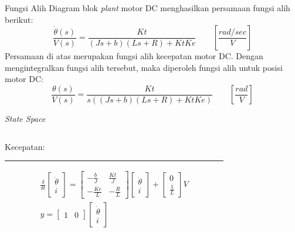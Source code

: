 \documentclass[10pt,xcolor={dvipsnames}]{beamer}
\begin{document}
\begin{frame}{Fungsi Alih}
	Diagram blok \textit{plant} motor DC menghasilkan persamaan fungsi alih berikut:
	\begin{equation}
		\frac{\dot{\theta}(s)}{V(s)}=\frac{Kt}{(Js+b)(Ls+R)+KtKe} \qquad \left[\frac{rad/sec}{V}\right] 
	\end{equation} 
	Persamaan di atas merupakan fungsi alih kecepatan motor DC. Dengan mengintegralkan fungsi alih tersebut, maka diperoleh fungsi alih untuk posisi motor DC:
	\begin{equation}
		\frac{\theta(s)}{V(s)}=\frac{Kt}{s((Js+b)(Ls+R)+KtKe)} \qquad \left[\frac{rad}{V}\right]
		\label{position}
	\end{equation}
\end{frame}

\begin{frame}{\textit{State Space}}
	\begin{columns}[T]
		\begin{column}{0.5\textwidth}
			Kecepatan:
			\color{black}\rule{\linewidth}{4pt}
			\begin{equation}
				\begin{split}
					\frac{\delta}{\delta t}
					\begin{bmatrix}
						\dot{\theta} \\ i
					\end{bmatrix}
					=
					\begin{bmatrix}
						-\frac{b}{J} & \frac{Kt}{J}\\
						-\frac{Ke}{L} & -\frac{R}{L}
					\end{bmatrix}
					\begin{bmatrix}
						\dot{\theta} \\ i
					\end{bmatrix}
					+
					\begin{bmatrix}
						0 \\ \frac{1}{L}
					\end{bmatrix}
					V\\
					y=
					\begin{bmatrix}
						1 & 0
					\end{bmatrix}
					\begin{bmatrix}
						\dot{\theta} \\ i
					\end{bmatrix}
				\end{split}
			\end{equation}
		\end{column}%
		\hfill%
		\begin{column}{0.5\textwidth}

\end{column}
\end{columns}
\end{frame}
\end{document}
